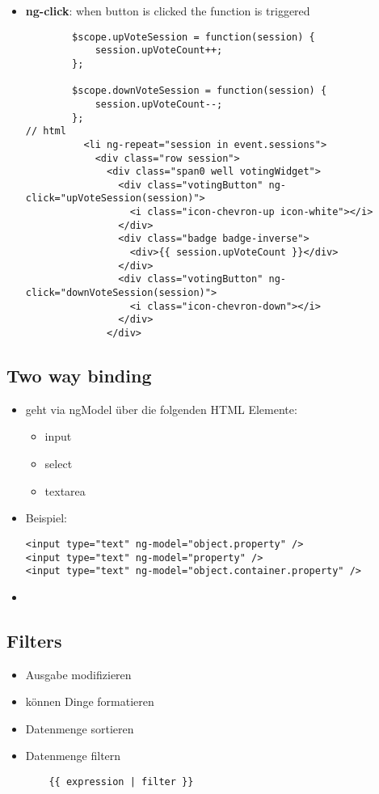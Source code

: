 
\begin{itemize}
  \item \textbf{ng-click}: when button is clicked the function is triggered
    \begin{verbatim}
        $scope.upVoteSession = function(session) {
            session.upVoteCount++;
        };

        $scope.downVoteSession = function(session) {
            session.upVoteCount--;
        };
// html
          <li ng-repeat="session in event.sessions">
            <div class="row session">
              <div class="span0 well votingWidget">
                <div class="votingButton" ng-click="upVoteSession(session)">
                  <i class="icon-chevron-up icon-white"></i>
                </div>
                <div class="badge badge-inverse">
                  <div>{{ session.upVoteCount }}</div>
                </div>
                <div class="votingButton" ng-click="downVoteSession(session)">
                  <i class="icon-chevron-down"></i>
                </div>
              </div>
    \end{verbatim}
\end{itemize}


\subsection{Two way binding}
\begin{itemize}
  \item geht via ngModel über die folgenden HTML Elemente:
    \begin{itemize}
      \item input
      \item select
      \item textarea
    \end{itemize}
  \item Beispiel:
    \begin{verbatim}
<input type="text" ng-model="object.property" />
<input type="text" ng-model="property" />
<input type="text" ng-model="object.container.property" />
    \end{verbatim}
  \item
\end{itemize}

\subsection{Filters}
\begin{itemize}
  \item Ausgabe modifizieren
  \item können Dinge formatieren
  \item Datenmenge sortieren
  \item Datenmenge filtern
    \begin{verbatim}
    {{ expression | filter }}
    \end{verbatim}
\end{itemize}


